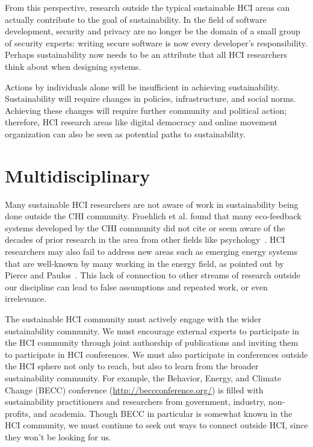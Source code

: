 \documentclass{sigchi}
\begin{document}
From this perspective, research outside the typical sustainable HCI areas can actually contribute to the goal of sustainability. In the field of software development, security and privacy are no longer be the domain of a small group of security experts: writing secure software is now every developer's responsibility. Perhaps sustainability now needs to be an attribute that all HCI researchers think about when designing systems.

Actions by individuals alone will be insufficient in achieving sustainability. Sustainability will require changes in policies, infrastructure, and social norms. Achieving these changes will require further community and political action; therefore, HCI research areas like digital democracy and online movement organization can also be seen as potential paths to sustainability.


\section{Multidisciplinary}

Many sustainable HCI researchers are not aware of work in sustainability being done outside the CHI community. Froehlich et al. found that many eco-feedback systems developed by the CHI community did not cite or seem aware of the decades of prior research in the area from other fields like psychology~\cite{Froehlich2010}. HCI researchers may also fail to address new areas such as emerging energy systems that are well-known by many working in the energy field, as pointed out by Pierce and Paulos~\cite{Pierce2012-BEM}. This lack of connection to other streams of research outside our discipline can lead to false assumptions and repeated work, or even irrelevance.

The sustainable HCI community must actively engage with the wider sustainability community. We must encourage external experts to participate in the HCI community through joint authorship of publications and inviting them to participate in HCI conferences. We must also participate in conferences outside the HCI sphere not only to reach, but also to learn from the broader sustainability community. For example, the Behavior, Energy, and Climate Change (BECC) conference (\url{http://beccconference.org/}) is filled with sustainability practitioners and researchers from government, industry, non-profits, and academia. Though BECC in particular is somewhat known in the HCI community, we must continue to seek out ways to connect outside HCI, since they won't be looking for us.
\end{document}
